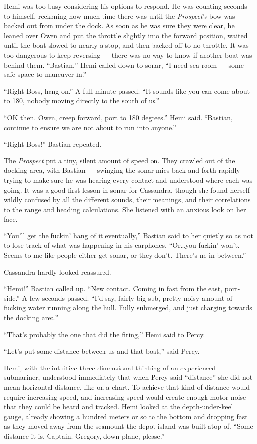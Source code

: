 \documentclass[
]{scrbook}
\begin{document}
Hemi was too busy considering his options to respond. He was counting
seconds to himself, reckoning how much time there was until the
\emph{Prospect}'s bow was backed out from under the dock. As soon as he
was sure they were clear, he leaned over Owen and put the throttle
slightly into the forward position, waited until the boat slowed to
nearly a stop, and then backed off to no throttle. It was too dangerous
to keep reversing --- there was no way to know if another boat was
behind them. ``Bastian,'' Hemi called down to sonar, ``I need sea room
--- some safe space to maneuver in.''

``Right Boss, hang on.'' A full minute passed. ``It sounds like you can
come about to 180, nobody moving directly to the south of us.''

``OK then. Owen, creep forward, port to 180 degrees.'' Hemi said.
``Bastian, continue to ensure we are not about to run into anyone.''

``Right Boss!'' Bastian repeated.

The \emph{Prospect} put a tiny, silent amount of speed on. They crawled
out of the docking area, with Bastian --- swinging the sonar mics back
and forth rapidly --- trying to make sure he was hearing every contact
and understood where each was going. It was a good first lesson in sonar
for Cassandra, though she found herself wildly confused by all the
different sounds, their meanings, and their correlations to the range
and heading calculations. She listened with an anxious look on her face.

``You'll get the fuckin' hang of it eventually,'' Bastian said to her
quietly so as not to lose track of what was happening in his earphones.
``Or\ldots you fuckin' won't. Seems to me like people either get sonar,
or they don't. There's no in between.''

Cassandra hardly looked reassured.

``Hemi!'' Bastian called up. ``New contact. Coming in fast from the
east, port-side.'' A few seconds passed. ``I'd say, fairly big sub,
pretty noisy amount of fucking water running along the hull. Fully
submerged, and just charging towards the docking area.''

``That's probably the one that did the firing,'' Hemi said to Percy.

``Let's put some distance between us and that boat,'' said Percy.

Hemi, with the intuitive three-dimensional thinking of an experienced
submariner, understood immediately that when Percy said ``distance'' she
did not mean horizontal distance, like on a chart. To achieve that kind
of distance would require increasing speed, and increasing speed would
create enough motor noise that they could be heard and tracked. Hemi
looked at the depth-under-keel gauge, already showing a hundred meters
or so to the bottom and dropping fast as they moved away from the
seamount the depot island was built atop of. ``Some distance it is,
Captain. Gregory, down plane, please.''
\end{document}
